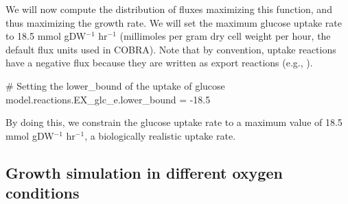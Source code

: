 \noindent We will now compute the distribution of fluxes maximizing this function, and thus maximizing the growth rate.
We will set the maximum glucose uptake rate to 18.5 mmol gDW$^{-1}$ hr$^{-1}$ (millimoles per gram dry cell weight per hour, the default flux units used in COBRA).
Note that by convention, uptake reactions have a negative flux because they are written as export reactions (e.g., ). 
\begin{code-python}
# Setting the lower_bound of the uptake of glucose
model.reactions.EX_glc_e.lower_bound = -18.5
\end{code-python}
By doing this, we constrain the glucose uptake rate to a maximum value of 18.5 mmol gDW$^{-1}$ hr$^{-1}$, a biologically realistic uptake rate.


\subsection*{Growth simulation in different oxygen conditions}

